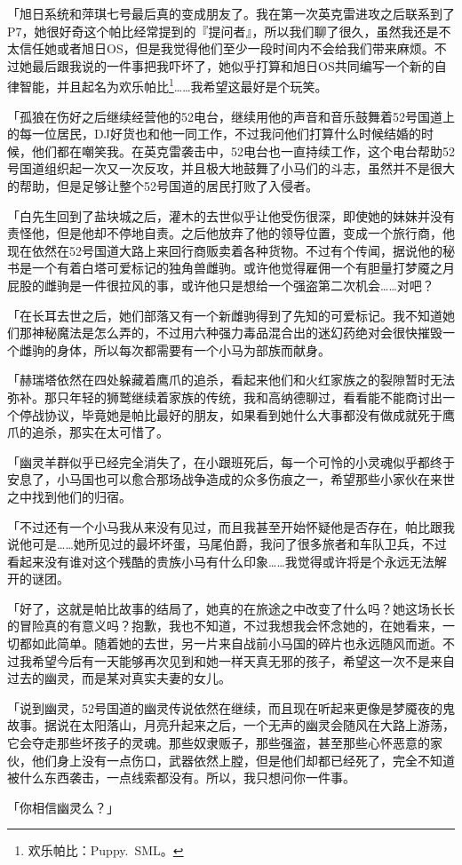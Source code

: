 {「旭日系统和萍琪七号最后真的变成朋友了。我在第一次英克雷进攻之后联系到了P7，她很好奇这个帕比经常提到的『提问者』，所以我们聊了很久，虽然我还是不太信任她或者旭日OS，但是我觉得他们至少一段时间内不会给我们带来麻烦。不过她最后跟我说的一件事把我吓坏了，她似乎打算和旭日OS共同编写一个新的自律智能，并且起名为欢乐帕比\footnote{欢乐帕比：Puppy.~SML。}……我希望这最好是个玩笑。

「孤狼在伤好之后继续经营他的52电台，继续用他的声音和音乐鼓舞着52号国道上的每一位居民，DJ好货也和他一同工作，不过我问他们打算什么时候结婚的时候，他们都在嘲笑我。在英克雷袭击中，52电台也一直持续工作，这个电台帮助52号国道组织起一次又一次反攻，并且极大地鼓舞了小马们的斗志，虽然并不是很大的帮助，但是足够让整个52号国道的居民打败了入侵者。

「白先生回到了盐块城之后，灌木的去世似乎让他受伤很深，即使她的妹妹并没有责怪他，但是他却不停地自责。之后他放弃了他的领导位置，变成一个旅行商，他现在依然在52号国道大路上来回行商贩卖着各种货物。不过有个传闻，据说他的秘书是一个有着白塔可爱标记的独角兽雌驹。或许他觉得雇佣一个有胆量打梦魇之月屁股的雌驹是一件很拉风的事，或许他只是想给一个强盗第二次机会……对吧？

「在长耳去世之后，她们部落又有一个新雌驹得到了先知的可爱标记。我不知道她们那神秘魔法是怎么弄的，不过用六种强力毒品混合出的迷幻药绝对会很快摧毁一个雌驹的身体，所以每次都需要有一个小马为部族而献身。

「赫瑞塔依然在四处躲藏着鹰爪的追杀，看起来他们和火红家族之的裂隙暂时无法弥补。那只年轻的狮鹫继续着家族的传统，我和高纳德聊过，看看能不能商讨出一个停战协议，毕竟她是帕比最好的朋友，如果看到她什么大事都没有做成就死于鹰爪的追杀，那实在太可惜了。

「幽灵羊群似乎已经完全消失了，在小跟班死后，每一个可怜的小灵魂似乎都终于安息了，小马国也可以愈合那场战争造成的众多伤痕之一，希望那些小家伙在来世之中找到他们的归宿。

「不过还有一个小马我从来没有见过，而且我甚至开始怀疑他是否存在，帕比跟我说他可是……她所见过的最坏坏蛋，马尾伯爵，我问了很多旅者和车队卫兵，不过看起来没有谁对这个残酷的贵族小马有什么印象……我觉得或许将是个永远无法解开的谜团。

「好了，这就是帕比故事的结局了，她真的在旅途之中改变了什么吗？她这场长长的冒险真的有意义吗？抱歉，我也不知道，不过我想我会怀念她的，在她看来，一切都如此简单。随着她的去世，另一片来自战前小马国的碎片也永远随风而逝。不过我希望今后有一天能够再次见到和她一样天真无邪的孩子，希望这一次不是来自过去的幽灵，而是某对真实夫妻的女儿。

「说到幽灵，52号国道的幽灵传说依然在继续，而且现在听起来更像是梦魇夜的鬼故事。据说在太阳落山，月亮升起来之后，一个无声的幽灵会随风在大路上游荡，它会夺走那些坏孩子的灵魂。那些奴隶贩子，那些强盗，甚至那些心怀恶意的家伙，他们身上没有一点伤口，武器依然上膛，但是他们却都已经死了，完全不知道被什么东西袭击，一点线索都没有。所以，我只想问你一件事。

「你相信幽灵么？」

}


